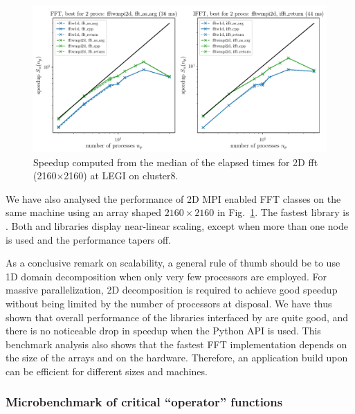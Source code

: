 \begin{figure}[htp!]
\centering
\includegraphics[width=\linewidth]{tmp/fig_legi_cluster8_2160x2160}
\caption{Speedup computed from the median of the elapsed times for 2D fft
(2160$\times$2160) at LEGI on cluster8.}
\label{fig:cluster8:2160x2160}
\end{figure}

We have also analysed the performance of 2D MPI enabled FFT classes on the same
machine using an array shaped $2160\times2160$ in
Fig.~\ref{fig:cluster8:2160x2160}. The fastest library is
. Both  and 
libraries display near-linear scaling, except when more than one node is used
and the performance tapers off.

As a conclusive remark on scalability, a general rule of thumb should be to use
1D domain decomposition when only very few processors are employed. For massive
parallelization, 2D decomposition is required to achieve good speedup without
being limited by the number of processors at disposal. We have thus shown that
overall performance of the libraries interfaced by  are quite
good, and there is no noticeable drop in speedup when the Python API is used.
%
This benchmark analysis also shows that the fastest FFT implementation depends
on the size of the arrays and on the hardware.
%
Therefore, an application build upon  can be efficient for
different sizes and machines.


\subsubsection{Microbenchmark of critical ``operator'' functions}

